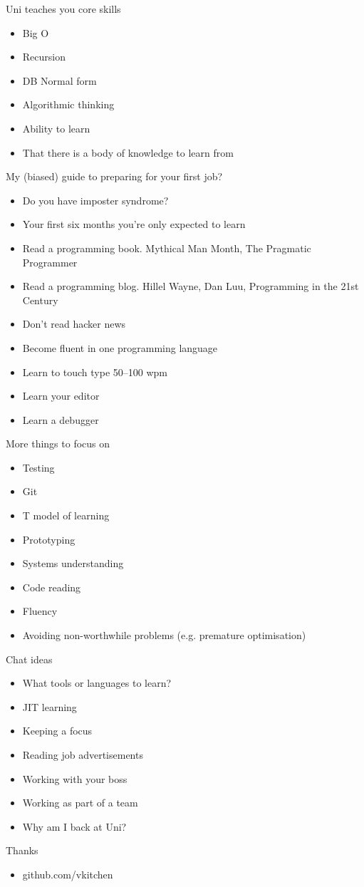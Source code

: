 \documentclass{beamer}
\begin{document}
\begin{frame}{Uni teaches you core skills}
\begin{itemize}
\item Big O
\item Recursion
\item DB Normal form
\item Algorithmic thinking
\item Ability to learn
\item That there is a body of knowledge to learn from
\end{itemize}
\end{frame}

\begin{frame}{My (biased) guide to preparing for your first job?}
\begin{itemize}
\item Do you have imposter syndrome?
\item Your first six months you're only expected to learn
\item Read a programming book. Mythical Man Month, The Pragmatic Programmer
\item Read a programming blog. Hillel Wayne, Dan Luu, Programming in the 21st Century
\item Don't read hacker news
\item Become fluent in one programming language
\item Learn to touch type 50--100 wpm
\item Learn your editor
\item Learn a debugger
\end{itemize}
\end{frame}

\begin{frame}{More things to focus on}
\begin{itemize}
\item Testing
\item Git
\item T model of learning
\item Prototyping
\item Systems understanding
\item Code reading
\item Fluency
\item Avoiding non-worthwhile problems (e.g. premature optimisation)
\end{itemize}
\end{frame}

\begin{frame}{Chat ideas}
\begin{itemize}
\item What tools or languages to learn?
\item JIT learning
\item Keeping a focus
\item Reading job advertisements
\item Working with your boss
\item Working as part of a team
\item Why am I back at Uni?
\end{itemize}
\end{frame}

\begin{frame}{Thanks}
\begin{itemize}
\item github.com/vkitchen
\end{itemize}
\end{frame}
\end{document}

